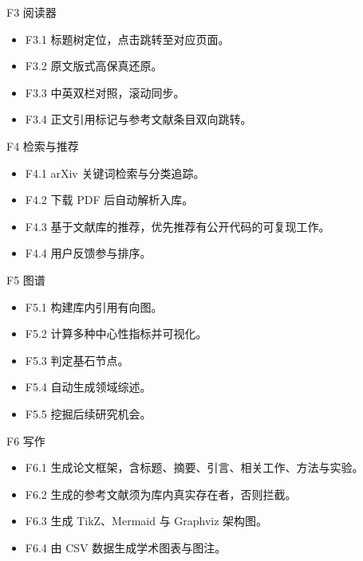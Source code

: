 \documentclass[UTF8,fontset=windows,zihao=5,a4paper]{ctexart}
\begin{document}
F3 阅读器

\begin{itemize}
\item F3.1 标题树定位，点击跳转至对应页面。
\item F3.2 原文版式高保真还原。
\item F3.3 中英双栏对照，滚动同步。
\item F3.4 正文引用标记与参考文献条目双向跳转。
\end{itemize}

F4 检索与推荐

\begin{itemize}
\item F4.1 arXiv 关键词检索与分类追踪。
\item F4.2 下载 PDF 后自动解析入库。
\item F4.3 基于文献库的推荐，优先推荐有公开代码的可复现工作。
\item F4.4 用户反馈参与排序。
\end{itemize}

F5 图谱

\begin{itemize}
\item F5.1 构建库内引用有向图。
\item F5.2 计算多种中心性指标并可视化。
\item F5.3 判定基石节点。
\item F5.4 自动生成领域综述。
\item F5.5 挖掘后续研究机会。
\end{itemize}

F6 写作

\begin{itemize}
\item F6.1 生成论文框架，含标题、摘要、引言、相关工作、方法与实验。
\item F6.2 生成的参考文献须为库内真实存在者，否则拦截。
\item F6.3 生成 TikZ、Mermaid 与 Graphviz 架构图。
\item F6.4 由 CSV 数据生成学术图表与图注。
\end{itemize}
\end{document}
